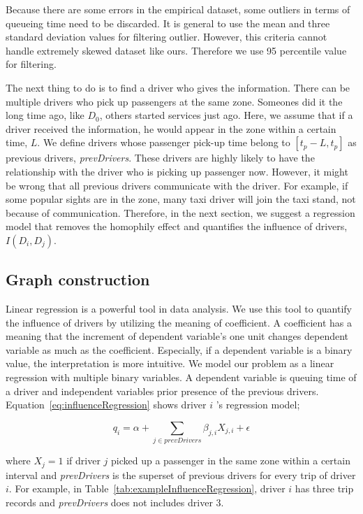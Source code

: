 \documentclass{article}
\begin{document}
Because there are some errors in the empirical dataset, some outliers in terms of queueing time need to be discarded. It is general to use the mean and three standard deviation values for filtering outlier. However, this criteria cannot handle extremely skewed dataset like ours. Therefore we use 95 percentile value for filtering. 

The next thing to do is to find a driver who gives the information. There can be multiple drivers who pick up passengers at the same zone. Someones did it the long time ago, like $D_0$, others started services just ago. Here, we assume that if a driver received the information, he would appear in the zone within a certain time, $L$. We define drivers whose passenger pick-up time belong to $[t_{p}-L,t_{p}]$ as previous drivers, \emph{prevDrivers}. These drivers are highly likely to have the relationship with the driver who is picking up passenger now. However, it might be wrong that all previous drivers communicate with the driver. For example, if some popular sights are in the zone, many taxi driver will join the taxi stand, not because of communication. Therefore, in the next section, we suggest a regression model that removes the homophily effect and quantifies the influence of drivers, $I(D_i,D_j)$.

\subsection{Graph construction} \label{sec:graphConstruction}

Linear regression is a powerful tool in data analysis. We use this tool to quantify the influence of drivers by utilizing the meaning of coefficient. A coefficient has a meaning that the increment of dependent variable's one unit changes dependent variable as much as the coefficient. Especially, if a dependent variable is a binary value, the interpretation is more intuitive. We model our problem as a linear regression with multiple binary variables. A dependent variable is queuing time of a driver and independent variables prior presence of the previous drivers. Equation~\ref{eq:influenceRegression} shows driver $i$ 's regression model;

\begin{equation} \label{eq:influenceRegression}
	q_{i}=\alpha + \sum_{j \in prevDrivers} \beta_{j,i}X_{j,i} + \epsilon
\end{equation}

\noindent where $X_{j}=1$ if driver $j$ picked up a passenger in the same zone within a certain interval and \emph{prevDrivers} is the superset of previous drivers for every trip of driver $i$. For example, in Table~\ref{tab:exampleInfluenceRegression}, driver $i$ has three trip records and \emph{prevDrivers} does not includes driver 3.
\end{document}
